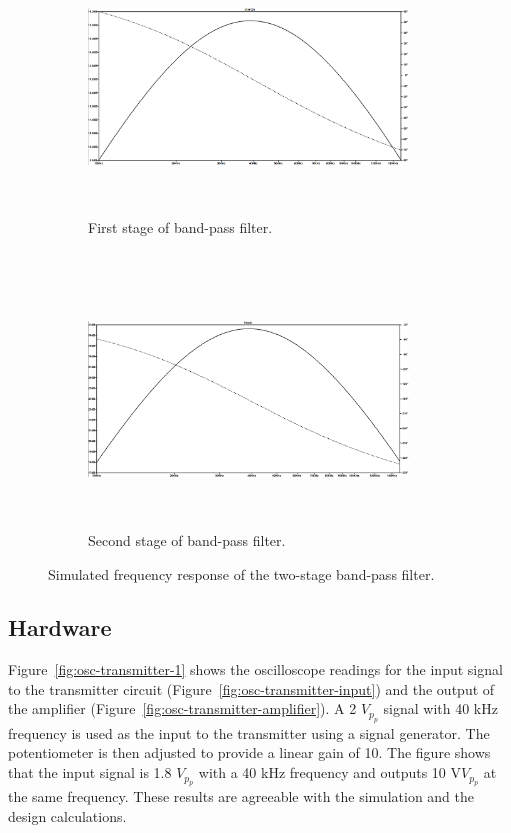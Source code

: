 \documentclass[class=report,11pt,crop=false]{standalone}
\begin{document}
\begin{figure}[htbp]
    \centering
    \captionsetup{type=figure}
    \begin{subfigure}[t]{0.45\textwidth}
        \centering
        \def\svgwidth{1\linewidth}
        {\scriptsize
            \includegraphics[width=8.5cm,height=6cm]{../Images/sim/filter_stage_1.png}}
        \caption{First stage of band-pass filter.}
        \label{fig:filter-stage-1}
    \end{subfigure}%
    ~ 
    \begin{subfigure}[t]{0.5\textwidth}
        \def\svgwidth{1\linewidth}
        {\scriptsize
            \includegraphics[width=8.5cm,height=6cm]{../Images/sim/filter_stage_2.png}}
        \caption{Second stage of band-pass filter.}
        \label{fig:filter-stage-2}
    \end{subfigure}
    \caption{Simulated frequency response of the two-stage band-pass filter.}
    \label{fig:band-pass-filter-simulations}
\end{figure}

\subsection{Hardware}
Figure~\ref{fig:osc-transmitter-1} shows the oscilloscope readings for the input signal to the transmitter circuit (Figure~\ref{fig:osc-transmitter-input}) and the output of the amplifier (Figure~\ref{fig:osc-transmitter-amplifier}). A 2 $V_p_p$ signal with 40 kHz frequency is used as the input to the transmitter using a signal generator. The potentiometer is then adjusted to provide a linear gain of 10. The figure shows that the input signal is 1.8 $V_p_p$ with a 40 kHz frequency and outputs 10 V$V_p_p$ at the same frequency. These results are agreeable with the simulation and the design calculations.
\end{document}
